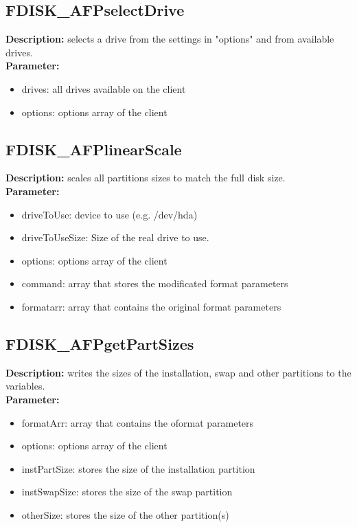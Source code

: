 \subsection{FDISK\_AFPselectDrive}
\textbf{Description:} selects a drive from the settings in "options" and from available drives.\\
\textbf{Parameter:}
\begin{itemize}
\item drives: all drives available on the client
\item options: options array of the client
\end{itemize}

\subsection{FDISK\_AFPlinearScale}
\textbf{Description:} scales all partitions sizes to match the full disk size.\\
\textbf{Parameter:}
\begin{itemize}
\item driveToUse: device to use (e.g. /dev/hda)
\item driveToUseSize: Size of the real drive to use.
\item options: options array of the client
\item command: array that stores the modificated format parameters
\item formatarr: array that contains the original format parameters
\end{itemize}

\subsection{FDISK\_AFPgetPartSizes}
\textbf{Description:} writes the sizes of the installation, swap and other partitions to the variables.\\
\textbf{Parameter:}
\begin{itemize}
\item formatArr: array that contains the oformat parameters
\item options: options array of the client
\item instPartSize: stores the size of the installation partition
\item instSwapSize: stores the size of the swap partition
\item otherSize: stores the size of the other partition(s)
\end{itemize}

